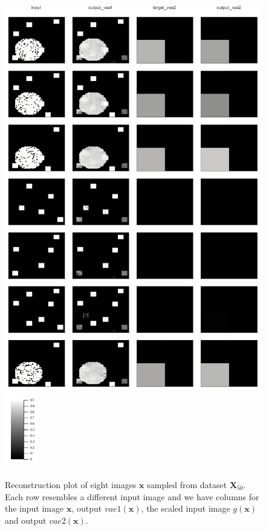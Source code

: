 \documentclass[12pt]{report}
\theoremstyle{definition}
\begin{document}
\begin{figure}
\begin{center}
  \includegraphics[width=11.5cm]{../code/plots/reconstruction2_1_8.png}
  \includegraphics[width=1.5cm]{../code/plots/scale.png}
  \caption{Reconstruction plot of eight images $\mathbf{x}$ sampled from dataset $\mathbf{X}_{50}$. Each row resembles a different input image and we have columns for the input image $\mathbf{x}$, output $vae1(\mathbf{x})$, the scaled input image $g(\mathbf{x})$ and output $vae2(\mathbf{x})$.}
  \label{fig:recon2}
\end{center}
\end{figure}
\end{document}
